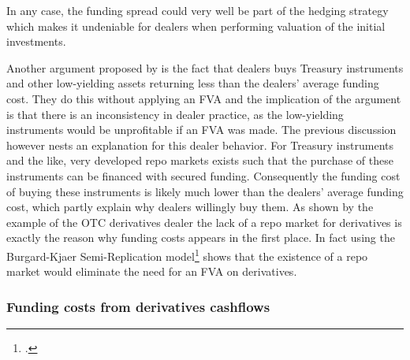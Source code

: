 \documentclass[../../../main.tex]{subfiles}
\begin{document}
        In any case,
        the funding spread could very well be part of the hedging strategy which makes it undeniable for dealers when performing valuation of the initial investments.

        Another argument proposed by \cite{HullWhite2012FVA} is the fact that dealers buys Treasury instruments and other low-yielding assets returning less than the dealers' average funding cost.
        They do this without applying an FVA and the implication of the argument is that there is an inconsistency in dealer practice,
        as the low-yielding instruments would be unprofitable if an FVA was made.
        The previous discussion however nests an explanation for this dealer behavior.
        For Treasury instruments and the like,
        very developed repo markets exists such that the purchase of these instruments can be financed with secured funding.
        Consequently the funding cost of buying these instruments is likely much lower than the dealers' average funding cost,
        which partly explain why dealers willingly buy them.
        As shown by the example of the OTC derivatives dealer the lack of a repo market for derivatives is exactly the reason why funding costs appears in the first place.
        In fact \cite[Section~9.4.1]{Green2015XVA} using the Burgard-Kjaer Semi-Replication model\footcite{BurgardKjaer2013Funding} shows that the existence of a repo market would eliminate the need for an FVA on derivatives. 
        
    \subsubsection{Funding costs from derivatives cashflows}
\end{document}
